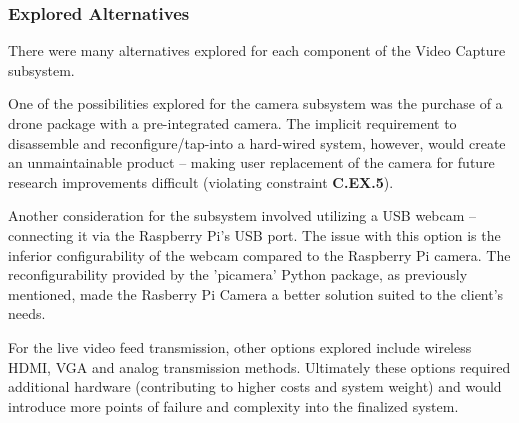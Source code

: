 \subsubsection{Explored Alternatives}
There were many alternatives explored for each component of the Video Capture subsystem.

One of the possibilities explored for the camera subsystem was the purchase of a drone package with a pre-integrated camera. The implicit requirement to disassemble and reconfigure/tap-into a hard-wired system, however, would create an unmaintainable product -- making user replacement of the camera for future research improvements difficult (violating constraint \textbf{C.EX.5}).

Another consideration for the subsystem involved utilizing a USB webcam -- connecting it via the Raspberry Pi's USB port. The issue with this option is the inferior configurability of the webcam compared to the Raspberry Pi camera. The reconfigurability provided by the 'picamera' Python package, as previously mentioned, made the Rasberry Pi Camera a better solution suited to the client's needs.

For the live video feed transmission, other options explored include wireless HDMI, VGA and analog transmission methods.  Ultimately these options required additional hardware (contributing to higher costs and system weight) and would introduce more points of failure and complexity into the finalized system.
